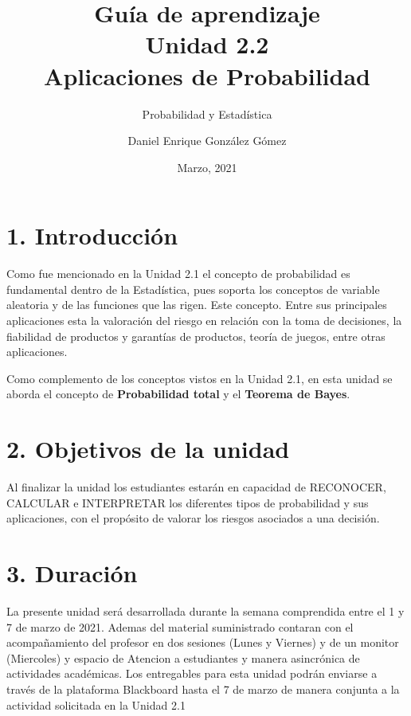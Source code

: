 \documentclass[base=hide,11pt]{elegantbook}
\title{Guía de  aprendizaje\\
	Unidad  2.2 \\
	Aplicaciones de Probabilidad}
\subtitle{Probabilidad y Estadística}
\author{Daniel Enrique González Gómez}
\institute{Pontificia Universidad Javeriana Cali}
\date{Marzo, 2021}
\begin{document}

\maketitle

\frontmatter
%
\mainmatter
\section*{1. Introducción}

Como fue mencionado en la Unidad 2.1 el concepto de probabilidad es fundamental dentro de la Estadística, pues soporta los conceptos de variable aleatoria y de las funciones que las rigen. Este concepto. Entre sus principales aplicaciones esta la valoración del riesgo en relación con la toma de decisiones, la fiabilidad de productos y garantías de productos, teoría de juegos, entre otras aplicaciones.

Como complemento de los conceptos vistos en la Unidad 2.1, en esta unidad se aborda el concepto de {\bf Probabilidad total} y el {\bf Teorema de Bayes}.


\section*{2. Objetivos de la unidad}

Al finalizar la unidad los estudiantes estarán  en  capacidad de  RECONOCER, CALCULAR e INTERPRETAR  los diferentes tipos de probabilidad y sus aplicaciones, con el propósito de valorar los riesgos asociados a una decisión. 

\section*{3. Duración}
La presente  unidad será desarrollada durante la semana comprendida entre el 1 y 7 de marzo de 2021. Ademas del material suministrado  contaran con el acompañamiento del profesor en dos sesiones (Lunes y Viernes) y de un monitor (Miercoles) y espacio de Atencion a estudiantes y 
manera asincrónica  de actividades académicas. Los entregables para esta unidad podrán enviarse a través de la plataforma Blackboard hasta el  7 de marzo de manera conjunta a la actividad solicitada en la Unidad 2.1
\end{document}
